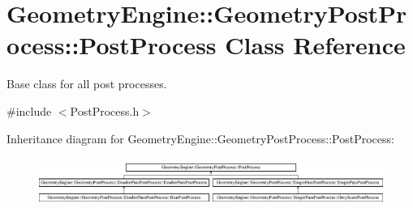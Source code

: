 \hypertarget{class_geometry_engine_1_1_geometry_post_process_1_1_post_process}{}\section{Geometry\+Engine\+::Geometry\+Post\+Process\+::Post\+Process Class Reference}
\label{class_geometry_engine_1_1_geometry_post_process_1_1_post_process}


Base class for all post processes.  




{\ttfamily \#include $<$Post\+Process.\+h$>$}

Inheritance diagram for Geometry\+Engine\+::Geometry\+Post\+Process\+::Post\+Process\+:\begin{figure}[H]
\begin{center}
\leavevmode
\includegraphics[height=1.587902cm]{class_geometry_engine_1_1_geometry_post_process_1_1_post_process}
\end{center}
\end{figure}
